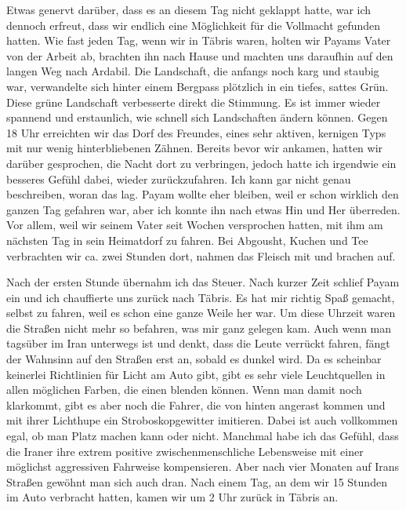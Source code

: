 Etwas genervt darüber, dass es an diesem Tag nicht geklappt hatte, war ich dennoch erfreut, dass wir endlich eine Möglichkeit für die Vollmacht gefunden hatten. Wie fast jeden Tag, wenn wir in Täbris waren, holten wir Payams Vater von der Arbeit ab, brachten ihn nach Hause und machten uns daraufhin auf den langen Weg nach Ardabil. Die Landschaft, die anfangs noch karg und staubig war, verwandelte sich hinter einem Bergpass plötzlich in ein tiefes, sattes Grün. Diese grüne Landschaft verbesserte direkt die Stimmung. Es ist immer wieder spannend und erstaunlich, wie schnell sich Landschaften ändern können. Gegen 18 Uhr erreichten wir das Dorf des Freundes, eines sehr aktiven, kernigen Typs mit nur wenig hinterbliebenen Zähnen. Bereits bevor wir ankamen, hatten wir darüber gesprochen, die Nacht dort zu verbringen, jedoch hatte ich irgendwie ein besseres Gefühl dabei, wieder zurückzufahren. Ich kann gar nicht genau beschreiben, woran das lag. Payam wollte eher bleiben, weil er schon wirklich den ganzen Tag gefahren war, aber ich konnte ihn nach etwas Hin und Her überreden. Vor allem, weil wir seinem Vater seit Wochen versprochen hatten, mit ihm am nächsten Tag in sein Heimatdorf zu fahren. Bei Abgousht, Kuchen und Tee verbrachten wir ca. zwei Stunden dort, nahmen das Fleisch mit und brachen auf.

Nach der ersten Stunde übernahm ich das Steuer. Nach kurzer Zeit schlief Payam ein und ich chauffierte uns zurück nach Täbris. Es hat mir richtig Spaß gemacht, selbst zu fahren, weil es schon eine ganze Weile her war. Um diese Uhrzeit waren die Straßen nicht mehr so befahren, was mir ganz gelegen kam. Auch wenn man tagsüber im Iran unterwegs ist und denkt, dass die Leute verrückt fahren, fängt der Wahnsinn auf den Straßen erst an, sobald es dunkel wird. Da es scheinbar keinerlei Richtlinien für Licht am Auto gibt, gibt es sehr viele Leuchtquellen in allen möglichen Farben, die einen blenden können. Wenn man damit noch klarkommt, gibt es aber noch die Fahrer, die von hinten angerast kommen und mit ihrer Lichthupe ein Stroboskopgewitter imitieren. Dabei ist auch vollkommen egal, ob man Platz machen kann oder nicht. Manchmal habe ich das Gefühl, dass die Iraner ihre extrem positive zwischenmenschliche Lebensweise mit einer möglichst aggressiven Fahrweise kompensieren. Aber nach vier Monaten auf Irans Straßen gewöhnt man sich auch dran. Nach einem Tag, an dem wir 15 Stunden im Auto verbracht hatten, kamen wir um 2 Uhr zurück in Täbris an.

